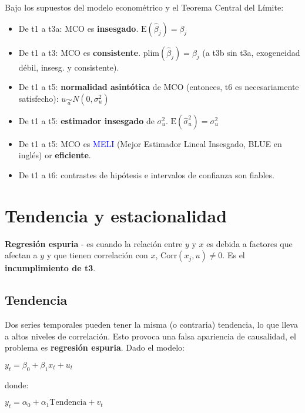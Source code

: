 \documentclass[10pt, a4paper, landscape]{extarticle}
\newcommand{\E}{\mathrm{E}}
\newcommand{\Corr}{\mathrm{Corr}}
\begin{document}
\begin{multicols}{3}
Bajo los supuestos del modelo econométrico y el Teorema Central del Límite:

\begin{itemize}[leftmargin=*]
	\item De t1 a t3a: MCO es \textbf{insesgado}. $\E(\hat{\beta}_j) = \beta_j$
	\item De t1 a t3: MCO es \textbf{consistente}. $\mathrm{plim}(\hat{\beta}_j) = \beta_j$ (a t3b sin t3a, exogeneidad débil, insesg. y consistente).
	\item De t1 a t5: \textbf{normalidad asintótica} de MCO (entonces, t6 es necesariamente satisfecho): $u \underset{a}{\sim} N(0, \sigma^2_u)$
	\item De t1 a t5: \textbf{estimador insesgado} de $\sigma^2_u$. $\E(\hat{\sigma}^2_u) = \sigma^2_u$
	\item De t1 a t5: MCO es \textcolor{blue}{MELI} (Mejor Estimador Lineal Insesgado, BLUE en inglés) or \textbf{eficiente}. 
	\item De t1 a t6: contrastes de hipótesis e intervalos de confianza son fiables.
\end{itemize}

\columnbreak

\section*{Tendencia y estacionalidad}

\textbf{Regresión espuria} - es cuando la relación entre $y$ y $x$ es debida a factores que afectan a $y$ y que tienen correlación con $x$, $\Corr(x_j, u) \neq 0$. Es el \textbf{incumplimiento de t3}.

\subsection*{Tendencia}

Dos series temporales pueden tener la misma (o contraria) tendencia, lo que lleva a altos niveles de correlación. Esto provoca una falsa apariencia de causalidad, el problema es \textbf{regresión espuria}. Dado el modelo:

\begin{center}
	$y_t = \beta_0 + \beta_1 x_t + u_t$
\end{center}

donde:

\begin{center}
	$y_t = \alpha_0 + \alpha_1 \mathrm{Tendencia} + v_t$


\end{center}
\end{multicols}
\end{document}
